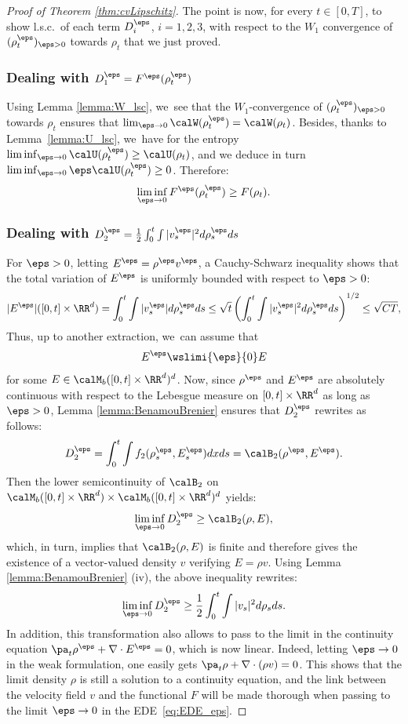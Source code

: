 \begin{proof}[Proof of Theorem \ref{thm:cvLipschitz}]
The point is now, for every $t \in [0,T]$, to show l.s.c.\ of each term $D_i^\eps$, $i = 1,2,3$, with respect to the $W_1$ convergence of $(\rho_t^\eps)_{\eps>0}$ towards $\rho_t$ that we just proved.

\subsubsection*{Dealing with $D_1^\eps = F^\eps(\rho^\eps_t)$}
Using Lemma \ref{lemma:W_lsc}, we~see that the $W_1$-convergence of $(\rho_t^\eps)_{\eps>0}$ towards $\rho_t$ ensures that $\lim_{\eps \to 0} \calW(\rho^\eps_t) = \calW(\rho_t)$. Besides, thanks to Lemma~\ref{lemma:U_lsc}, we~have for the entropy $\liminf_{\eps \to 0} \calU(\rho^\eps_t) \geq \calU(\rho_t)$, and we deduce in turn $\liminf_{\eps \to 0} \eps \calU(\rho^\eps_t) \geq 0$. Therefore:
\[
\liminf_{\eps \to 0} F^\eps(\rho^\eps_t) \geq F(\rho_t).
\]

\subsubsection*{Dealing with $D_2^\eps = \frac 12 \int_0^t \int |v^\eps_s|^2 d\rho^\eps_s ds$}

For $\eps > 0$, letting $E^\eps = \rho^\eps v^\eps$, a Cauchy-Schwarz inequality shows that the total variation of $E^\eps$ is uniformly bounded with respect to $\eps>0$:
\[
|E^\eps|([0,t] \times \RR^d) = \int_0^t \int |v^\eps_s| d\rho^\eps_s ds \leq \sqrt{t} \left(\int_0^t \int |v^\eps_s|^2 d\rho^\eps_s ds\right)^{1/2} \leq \sqrt{CT},
\]
Thus, up to another extraction, we~can assume that
\[
E^\eps \wslimi{\eps}{0} E
\]
for some $E \in \calM_b([0,t] \times \RR^d)^d$. Now, since $\rho^\eps$ and $E^\eps$ are absolutely continuous with respect to the Lebesgue measure on $[0,t] \times \RR^d$ as long as $\eps>0$, Lemma \ref{lemma:BenamouBrenier} ensures that $D_2^\eps$ rewrites as follows:
\[
D_2^\eps = \int_0^t \int f_2(\rho^\eps_s, E^\eps_s) dx ds = \calB_2(\rho^\eps, E^\eps).
\]
Then the lower semicontinuity of $\calB_2$ on $\calM_b([0,t] \times \RR^d) \times \calM_b([0,t] \times \RR^d)^d$ yields:
\[
\liminf_{\eps \to 0} D_2^\eps \geq \calB_2(\rho, E),
\]
which, in turn, implies that $\calB_2(\rho, E)$ is finite and therefore gives the existence of a vector-valued density $v$ verifying $E = \rho v$. Using Lemma \ref{lemma:BenamouBrenier} (iv), the above inequality rewrites:
\[
\liminf_{\eps \to 0} D_2^\eps \geq \frac 12 \int_0^t \int |v_s|^2 d\rho_s ds.
\]
In addition, this transformation also allows to pass to the limit in the continuity equation $\pa_t \rho^\eps + \nabla \cdot E^\eps = 0$, which is now linear. Indeed, letting $\eps \to 0$ in the weak formulation, one easily gets $\pa_t \rho + \nabla \cdot (\rho v) = 0$. This shows that the limit density $\rho$ is still a solution to a continuity equation, and the link between the velocity field $v$ and the functional $F$ will be made thorough when passing to the limit $\eps \to 0$ in the EDE~\eqref{eq:EDE_eps}.


\end{proof}
